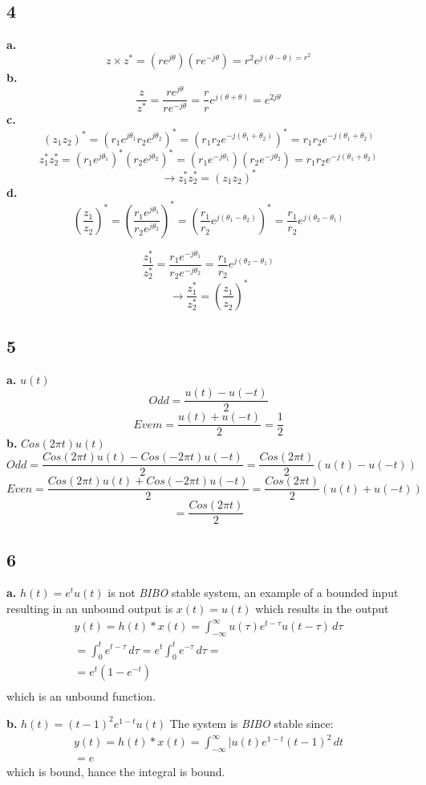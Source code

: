 \documentclass[10pt, letterpaper]{article}
\begin{document}
\subsection*{4}
\textbf{a.}
\[z \times z^* = (re^{j\theta})(re^{-j\theta}) = r^2 e^{j(\theta - \theta) = r^2} \]
\textbf{b.}
\[ \frac{z}{z^*} = \frac{re^{j\theta}}{re^{-j\theta}} = \frac{r}{r} e^{j (\theta + \theta)} = e^{2j\theta} \]
\textbf{c.}
\[(z_1 z_2)^* = (r_1 e^{j \theta_1} r_2 e^{j \theta_2})^* = (r_1 r_2 e^{-j(\theta_1 + \theta_2)})^* = r_1 r_2 e^{-j(\theta_1 + \theta_2)}\]
\[z_1^* z_2^* = (r_1e^{j\theta_1})^* (r_2e^{j\theta_2})^* = (r_1e^{-j\theta_1}) (r_2e^{-j\theta_2})  = r_1 r_2 e^{-j(\theta_1 + \theta_2)} \]
\[\rightarrow z_1^* z_2^* = (z_1 z_2)^*\]
\textbf{d.}
\[
(\frac{z_1}{z_2})^*  = (\frac{r_1e^{j\theta_1}}{r_2e^{j\theta_2}})^* =   (\frac{r_1}{r_2} e^{j(\theta_1 - \theta_2)})^* =     
\frac{r_1}{r_2} e^{j(\theta_2 - \theta_1)}
\]

\[
\frac{z_1^*}{z_2^*} =
\frac{r_1 e^{-j\theta_1}}{r_2 e^{-j\theta_2}} = 
\frac{r_1}{r_2} e^{j(\theta_2 - \theta_1)}
\]
\[
\rightarrow
\frac{z_1^*}{z_2^*} =(\frac{z_1}{z_2})^* 
\]

\subsection*{5}
\textbf{a.} $u(t)$
\[ Odd = \frac{u(t) - u(-t)}{2}\]
\[Evem = \frac{u(t) + u(-t)}{2} =  \frac{1}{2}\]
\textbf{b.} $Cos(2\pi t)u(t)$
\[Odd = \frac{Cos(2\pi t)u(t) - Cos(-2\pi t)u(-t)}{2} = \frac{Cos(2\pi t)}{2}(u(t) - u(-t))\]
\[Even = \frac{Cos(2\pi t)u(t) + Cos(-2\pi t)u(-t)}{2} = \frac{Cos(2\pi t)}{2}(u(t) + u(-t))\]
\[ = \frac{Cos(2\pi t)}{2}\]


\subsection*{6}
\textbf{a.} $h(t) = e^tu(t)$ is not \emph{BIBO} stable system, an example of a bounded input 
resulting in an unbound output is $x(t) = u(t)$ which results in the output
\begin{align*}
y(t) = h(t) * x(t) = 
\int_{-\infty}^{\infty} u(\tau)e^{t - \tau}u(t - \tau) \, d\tau \\
= \int_{0}^{t}e^{t - \tau} \, d\tau 
= e^t \int_{0}^{t}e^{-\tau} \, d\tau = \\
= \boxed{e^t (1 - e^{-t})}
\\
\end{align*}
which is an unbound function.

\textbf{b.} $h(t) = (t - 1)^2e^{1-t}u(t)$ The system is \emph{BIBO} stable since:
\begin{align*}
	y(t) = h(t) * x(t) = 
	\int_{-\infty}^{\infty} |u(t)e^{1 - t}(t - 1)^2 \, dt \\
	= e
\end{align*}
which is bound, hance the integral is bound.
\end{document}
